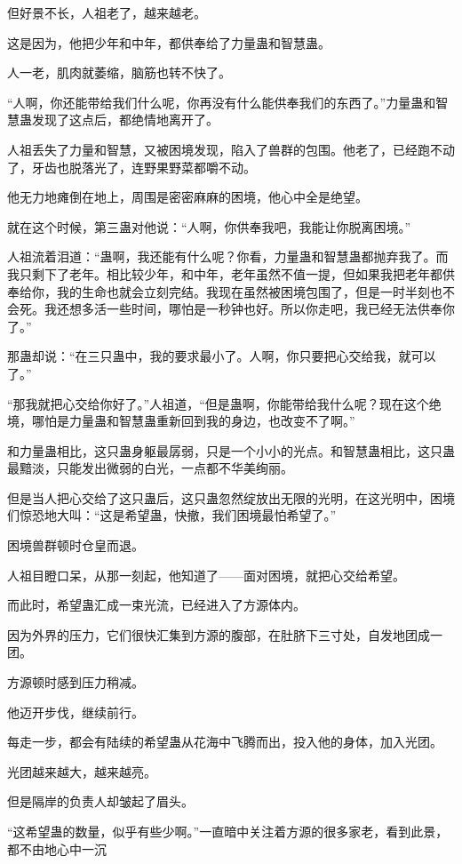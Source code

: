 \begin{this_body}
但好景不长，人祖老了，越来越老。

这是因为，他把少年和中年，都供奉给了力量蛊和智慧蛊。

人一老，肌肉就萎缩，脑筋也转不快了。

“人啊，你还能带给我们什么呢，你再没有什么能供奉我们的东西了。”力量蛊和智慧蛊发现了这点后，都绝情地离开了。

人祖丢失了力量和智慧，又被困境发现，陷入了兽群的包围。他老了，已经跑不动了，牙齿也脱落光了，连野果野菜都嚼不动。

他无力地瘫倒在地上，周围是密密麻麻的困境，他心中全是绝望。

就在这个时候，第三蛊对他说：“人啊，你供奉我吧，我能让你脱离困境。”

人祖流着泪道：“蛊啊，我还能有什么呢？你看，力量蛊和智慧蛊都抛弃我了。而我只剩下了老年。相比较少年，和中年，老年虽然不值一提，但如果我把老年都供奉给你，我的生命也就会立刻完结。我现在虽然被困境包围了，但是一时半刻也不会死。我还想多活一些时间，哪怕是一秒钟也好。所以你走吧，我已经无法供奉你了。”

那蛊却说：“在三只蛊中，我的要求最小了。人啊，你只要把心交给我，就可以了。”

“那我就把心交给你好了。”人祖道，“但是蛊啊，你能带给我什么呢？现在这个绝境，哪怕是力量蛊和智慧蛊重新回到我的身边，也改变不了啊。”

和力量蛊相比，这只蛊身躯最孱弱，只是一个小小的光点。和智慧蛊相比，这只蛊最黯淡，只能发出微弱的白光，一点都不华美绚丽。

但是当人把心交给了这只蛊后，这只蛊忽然绽放出无限的光明，在这光明中，困境们惊恐地大叫：“这是希望蛊，快撤，我们困境最怕希望了。”

困境兽群顿时仓皇而退。

人祖目瞪口呆，从那一刻起，他知道了——面对困境，就把心交给希望。

而此时，希望蛊汇成一束光流，已经进入了方源体内。

因为外界的压力，它们很快汇集到方源的腹部，在肚脐下三寸处，自发地团成一团。

方源顿时感到压力稍减。

他迈开步伐，继续前行。

每走一步，都会有陆续的希望蛊从花海中飞腾而出，投入他的身体，加入光团。

光团越来越大，越来越亮。

但是隔岸的负责人却皱起了眉头。

“这希望蛊的数量，似乎有些少啊。”一直暗中关注着方源的很多家老，看到此景，都不由地心中一沉


\end{this_body}
